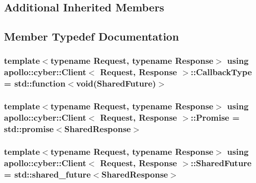 \subsection*{Additional Inherited Members}


\subsection{Member Typedef Documentation}
\hypertarget{classapollo_1_1cyber_1_1Client_a995b86997b158bccf18e65dd077cf406}{
\subsubsection[{Callback\-Type}]{\setlength{\rightskip}{0pt plus 5cm}template$<$typename Request, typename Response$>$ using {\bf apollo\-::cyber\-::\-Client}$<$ Request, Response $>$\-::{\bf Callback\-Type} =  std\-::function$<$void({\bf Shared\-Future})$>$}}\label{classapollo_1_1cyber_1_1Client_a995b86997b158bccf18e65dd077cf406}
\hypertarget{classapollo_1_1cyber_1_1Client_a0e85359f3942a4fe56bbecba331ed29e}{
\subsubsection[{Promise}]{\setlength{\rightskip}{0pt plus 5cm}template$<$typename Request, typename Response$>$ using {\bf apollo\-::cyber\-::\-Client}$<$ Request, Response $>$\-::{\bf Promise} =  std\-::promise$<${\bf Shared\-Response}$>$}}\label{classapollo_1_1cyber_1_1Client_a0e85359f3942a4fe56bbecba331ed29e}
\hypertarget{classapollo_1_1cyber_1_1Client_ae8316f7e75af5319222df2dce376eebc}{
\subsubsection[{Shared\-Future}]{\setlength{\rightskip}{0pt plus 5cm}template$<$typename Request, typename Response$>$ using {\bf apollo\-::cyber\-::\-Client}$<$ Request, Response $>$\-::{\bf Shared\-Future} =  std\-::shared\-\_\-future$<${\bf Shared\-Response}$>$}}\label{classapollo_1_1cyber_1_1Client_ae8316f7e75af5319222df2dce376eebc}
